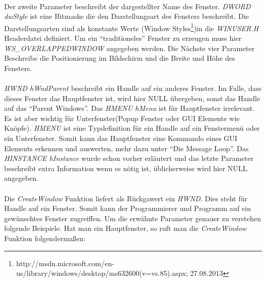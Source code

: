 \paragraph{}
Der zweite Parameter beschreibt der dargestellter Name des Fenster. \textit{DWORD dwStyle} ist eine Bitmaske die den Darstellungsart des Fensters beschreibt. Die Darstellungsarten sind als konstante Werte (Window Styles\footnote{http://msdn.microsoft.com/en-us/library/windows/desktop/ms632600(v=vs.85).aspx; 27.08.2013})in die \textit{WINUSER.H} Headerdatei definiert. Um ein "`traditioneles"' Fenster zu erzeugen muss hier \textit{WS\_OVERLAPPEDWINDOW} angegeben werden. Die Nächste vier Parameter Beschreibe die Positionierung im Bildschirm und die Breite und Höhe des Fensters. 

\paragraph{}
\textit{HWND hWndParent} beschreibt ein Handle auf ein anderes Fenster. Im Falle, dass dieses Fenster das Hauptfenster ist, wird hier NULL übergeben, sonst das Handle auf das "`Parent Windows"'. Das \textit{HMENU hMenu} ist für Hauptfenster irrelevant. Es ist aber wichtig für Unterfenster(Popup Fenster oder GUI Elemente wie Knöpfe). \textit{HMENU} ist eine Typdefinition für ein Handle auf ein Fenstermenü oder ein Unterfenster. Somit kann das Hauptfenster eine Kommando eines GUI Elements erkennen und auswerten, mehr dazu unter "`Die Message Loop"'. Das \textit{HINSTANCE hInstance} wurde schon vorher erläutert und das letzte Parameter beschreibt extra Information wenn es nötig ist, üblicherweise wird hier NULL angegeben.

\paragraph{}
Die \textit{CreateWindow} Funktion liefert als Rückgawert ein \textit{HWND}. Dies steht für Handle auf ein Fenster. Somit kann der Programmierer und Programm auf ein gewünschtes Fenster zugreiffen. Um die erwähnte Parameter genauer zu verstehen folgende Beispiele. Hat man ein Hauptfenster, so ruft man die \textit{CreateWindow} Funktion folgendermaßen:

